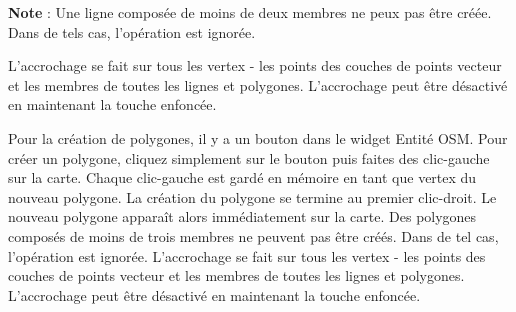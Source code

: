 \textbf{Note} : Une ligne composée de moins de deux membres ne peux pas être créée. Dans de tels cas, l'opération est ignorée.

L'accrochage se fait sur tous les vertex - les points des couches de points vecteur et les membres de toutes les lignes et polygones. L'accrochage peut être désactivé en maintenant la touche  enfoncée.


Pour la création de polygones, il y a un bouton  dans le widget Entité OSM. Pour créer un polygone, cliquez simplement sur le bouton puis faites des clic-gauche sur la carte. Chaque clic-gauche est gardé en mémoire en tant que vertex du nouveau polygone. La création du polygone se termine au premier clic-droit. Le nouveau polygone apparaît alors immédiatement sur la carte. Des polygones composés de moins de trois membres ne peuvent pas être créés. Dans de tel cas, l'opération est ignorée. L'accrochage se fait sur tous les vertex - les points des couches de points vecteur et les membres de toutes les lignes et polygones. L'accrochage peut être désactivé en maintenant la touche  enfoncée.


